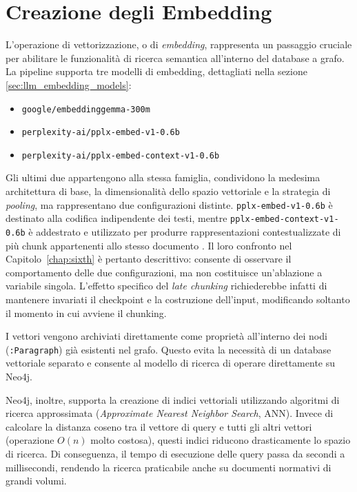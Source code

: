 \newpage
\section{Creazione degli Embedding}
\label{sec:creazione_embedding}

L'operazione di vettorizzazione, o di \textit{embedding}, rappresenta un passaggio cruciale per abilitare le funzionalità di ricerca semantica all'interno del database a grafo.
La pipeline supporta tre modelli di embedding, dettagliati nella sezione \ref{sec:llm_embedding_models}: 
\begin{itemize}
    \item \texttt{google/embeddinggemma-300m}
    \item \texttt{perplexity-ai/pplx-embed-v1-0.6b}
    \item \texttt{perplexity-ai/pplx-embed-context-v1-0.6b}
\end{itemize}

Gli ultimi due appartengono alla stessa famiglia, condividono la medesima architettura di base, la dimensionalità dello spazio vettoriale e la strategia di \textit{pooling}, ma rappresentano due configurazioni distinte. \texttt{pplx-embed-v1-0.6b} è destinato alla codifica indipendente dei testi, mentre \texttt{pplx-embed-context-v1-0.6b} è addestrato e utilizzato per produrre rappresentazioni contestualizzate di più chunk appartenenti allo stesso documento \cite{eslami2026pplxembed}. Il loro confronto nel Capitolo~\ref{chap:sixth} è pertanto descrittivo: consente di osservare il comportamento delle due configurazioni, ma non costituisce un'ablazione a variabile singola. L'effetto specifico del \textit{late chunking} richiederebbe infatti di mantenere invariati il checkpoint e la costruzione dell'input, modificando soltanto il momento in cui avviene il chunking.

I vettori vengono archiviati direttamente come proprietà all'interno dei nodi (\texttt{:Paragraph}) già esistenti nel grafo. Questo evita la necessità di un database vettoriale separato e consente al modello di ricerca di operare direttamente su Neo4j.

Neo4j, inoltre, supporta la creazione di indici vettoriali utilizzando algoritmi di ricerca approssimata (\textit{Approximate Nearest Neighbor Search}, ANN). Invece di calcolare la distanza coseno tra il vettore di query e tutti gli altri vettori (operazione $O(n)$ molto costosa), questi indici riducono drasticamente lo spazio di ricerca. Di conseguenza, il tempo di esecuzione delle query passa da secondi a millisecondi, rendendo la ricerca praticabile anche su documenti normativi di grandi volumi.

